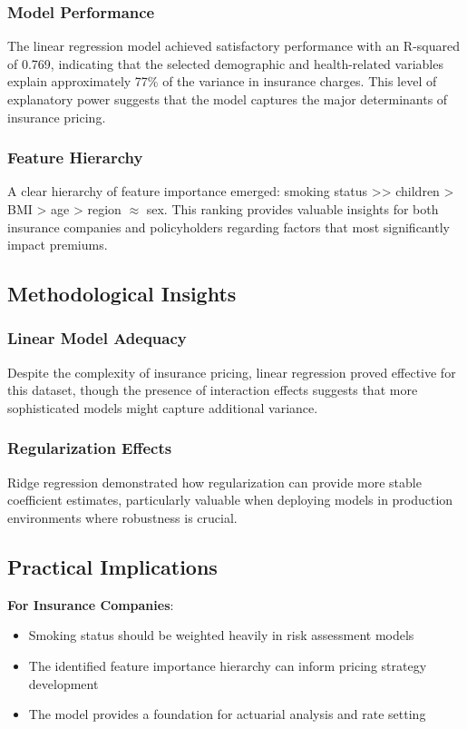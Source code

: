 \documentclass[12pt,a4paper]{article}
\begin{document}
\subsubsection{Model Performance}
The linear regression model achieved satisfactory performance with an R-squared of 0.769, indicating that the selected demographic and health-related variables explain approximately 77\% of the variance in insurance charges. This level of explanatory power suggests that the model captures the major determinants of insurance pricing.

\subsubsection{Feature Hierarchy}
A clear hierarchy of feature importance emerged: smoking status >> children > BMI > age > region $\approx$ sex. This ranking provides valuable insights for both insurance companies and policyholders regarding factors that most significantly impact premiums.

\subsection{Methodological Insights}

\subsubsection{Linear Model Adequacy}
    Despite the complexity of insurance pricing, linear regression proved effective for this dataset, though the presence of interaction effects suggests that more sophisticated models might capture additional variance.

\subsubsection{Regularization Effects}
    Ridge regression demonstrated how regularization can provide more stable coefficient estimates, particularly valuable when deploying models in production environments where robustness is crucial.

\subsection{Practical Implications}

\textbf{For Insurance Companies}:
\begin{itemize}
    \item Smoking status should be weighted heavily in risk assessment models
    \item The identified feature importance hierarchy can inform pricing strategy development
    \item The model provides a foundation for actuarial analysis and rate setting
\end{itemize}
\end{document}
